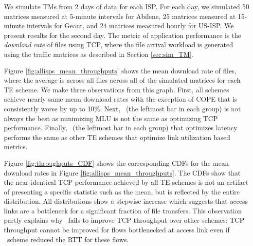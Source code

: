 We simulate TMs from 2 days of data for each ISP. For each day, we simulated 50 matrices measured at 5-minute intervals for Abilene, 25 matrices measured at 15-minute intervals for Geant, and 24 matrices measured hourly for US-ISP. We present results for the second day. The metric of application performance is the \emph{download rate} of files using TCP, where the file arrival workload is generated using the traffic matrices as described in Section \ref{sec:sim_TM}.

%


Figure \ref{fig:allisps_mean_throughputs} shows the mean download rate of files, where the average is across all files across all of the simulated matrices for each TE scheme.
We make three observations from this graph. 
First, all schemes achieve nearly same mean download rates with the exception of COPE that is consistently worse by up to  10\%.
Next, \opt\ (the leftmost bar in each group) is not always the best as minimizing MLU is not the same as optimizing TCP performance.
Finally,  \mindelay\ (the leftmost bar in each group) that optimizes latency performs the same as other TE schemes that optimize link utilization based metrics.


Figure \ref{fig:throughputs_CDF} shows the corresponding CDFs for the mean download rates in Figure \ref{fig:allisps_mean_throughputs}. The CDFs show that the near-identical TCP performance achieved by all TE schemes is not an artifact of presenting a specific statistic such as the mean, but is reflected by the entire distribution.  All distributions show a stepwise increase which suggests that access links are a bottleneck for a significant fraction of file transfers. This observation partly explains why \mindelay\ fails to  improve TCP throughput over other schemes: TCP throughput cannot be improved for flows bottlenecked at access link even if \mindelay\ scheme reduced the RTT for these flows.


